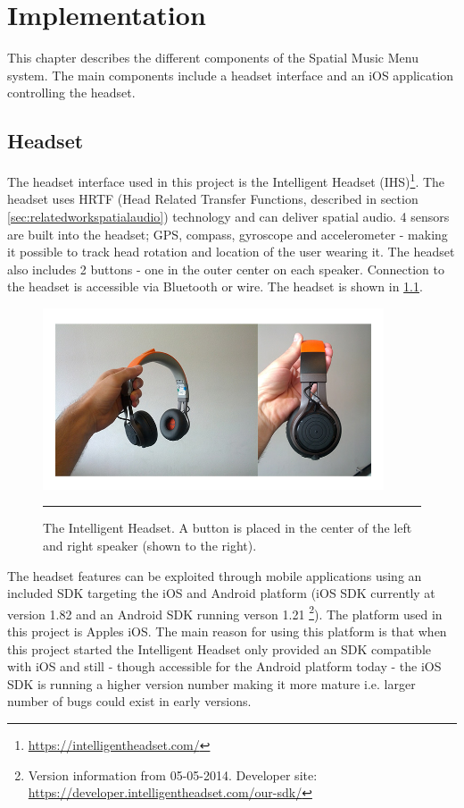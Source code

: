 \chapter{Implementation}
This chapter describes the different components of the Spatial Music Menu system. The main components include a headset interface and an iOS application controlling the headset.


\section{Headset}
\label{sec:implementationheadset}
The headset interface used in this project is the Intelligent Headset (IHS)\footnote{\url{https://intelligentheadset.com/}}. The headset uses HRTF (Head Related Transfer Functions, described in section \ref{sec:relatedworkspatialaudio}) technology and can deliver spatial audio. 4 sensors are built into the headset; GPS, compass, gyroscope and accelerometer - making it possible to track head rotation and location of the user wearing it. The headset also includes 2 buttons - one in the outer center on each speaker. Connection to the headset is accessible via Bluetooth or wire. The headset is shown in \ref{fig:headset}.

\begin{figure}[h]
	\centering
		\includegraphics[width=0.9\textwidth,height=\textheight,keepaspectratio]{./Figures/headset.jpg}
		\rule{35em}{1pt}
	\caption[The Intelligent Headset]{The Intelligent Headset. A button is placed in the center of the left and right speaker (shown to the right).}
	\label{fig:headset}
\end{figure}

The headset features can be exploited through mobile applications using an included SDK targeting the iOS and Android platform (iOS SDK currently at version 1.82 and an Android SDK running verson 1.21 \footnote{Version information from 05-05-2014. Developer site: \url{https://developer.intelligentheadset.com/our-sdk/}}). The platform used in this project is Apples iOS. The main reason for using this platform is that when this project started the Intelligent Headset only provided an SDK compatible with iOS and still - though accessible for the Android platform today - the iOS SDK is running a higher version number making it more mature i.e. larger number of bugs could exist in early versions.

